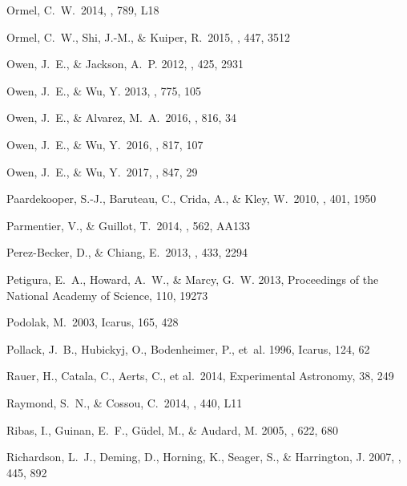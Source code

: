 \documentclass[]{emulateapj}
\begin{document}
\begin{thebibliography}{}
 Ormel, C.~W.\ 2014, \apjl, 789, L18 

 Ormel, C.~W., Shi, J.-M., \& Kuiper, R.\ 2015, \mnras, 447, 3512 

{Owen}, J.~E., \& {Jackson}, A.~P. 2012, \mnras, 425, 2931

{Owen}, J.~E., \& {Wu}, Y. 2013, \apj, 775, 105

 Owen, J.~E., \& Alvarez, M.~A.\ 2016, \apj, 816, 34 

 Owen, J.~E., \& Wu, Y.\ 2016, \apj, 817, 107 

 Owen, J.~E., \& Wu, Y.\ 2017, \apj, 847, 29 

 Paardekooper, 
S.-J., Baruteau, C., Crida, A., \& Kley, W.\ 2010, \mnras, 401, 1950 

 Parmentier, V., \& Guillot, T.\ 2014, \aap, 562, AA133 

 Perez-Becker, D., \& Chiang, E.\ 2013, \mnras, 433, 2294 

{Petigura}, E.~A., {Howard}, A.~W., \& {Marcy}, G.~W. 2013, Proceedings of the
  National Academy of Science, 110, 19273

 Podolak, M.\ 2003, Icarus, 165, 428 

{Pollack}, J.~B., {Hubickyj}, O., {Bodenheimer}, P., {et~al.} 1996, Icarus,
  124, 62

 Rauer, H., Catala, C., Aerts, C., et al.\ 2014, Experimental Astronomy, 38, 249 

 Raymond, S.~N., \& Cossou, C.\ 2014, \mnras, 440, L11 

{Ribas}, I., {Guinan}, E.~F., {G{\"u}del}, M., \& {Audard}, M. 2005, \apj, 622,
  680

{Richardson}, L.~J., {Deming}, D., {Horning}, K., {Seager}, S., \&
  {Harrington}, J. 2007, \nat, 445, 892


\end{thebibliography}
\end{document}
